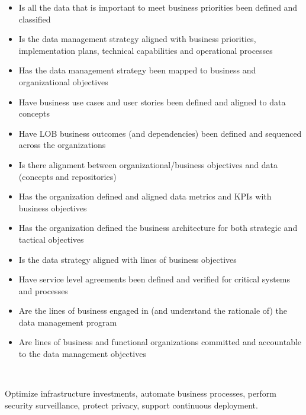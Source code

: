 \begin{description}[nosep,font=\bfseries]
\begin{itemize}
    \item Is all the data that is important to meet business priorities been defined and classified
    \item Is the data management strategy aligned with business priorities, implementation plans, technical capabilities and operational processes
    \item Has the data management strategy been mapped to business and organizational objectives
    \item Have business use cases and user stories been defined and aligned to data concepts
    \item Have LOB business outcomes (and dependencies) been defined and sequenced across the organizations
    \item Is there alignment between organizational/business objectives and data (concepts and repositories)
    \item Has the organization defined and aligned data metrics and KPIs with business objectives
    \item Has the organization defined the business architecture for both strategic and tactical objectives
    \item Is the data strategy aligned with lines of business objectives
    \item Have service level agreements been defined and verified for critical systems and processes
    \item Are the lines of business engaged in (and understand the rationale of) the data management program
    \item Are lines of business and functional organizations committed and accountable to the data management objectives
  \end{itemize}
  
  ~\\

  \item [High-Level Technology Goals]
  Optimize infrastructure investments, automate business processes, 
  perform security surveillance, protect privacy, support continuous deployment. \\


\end{description}
